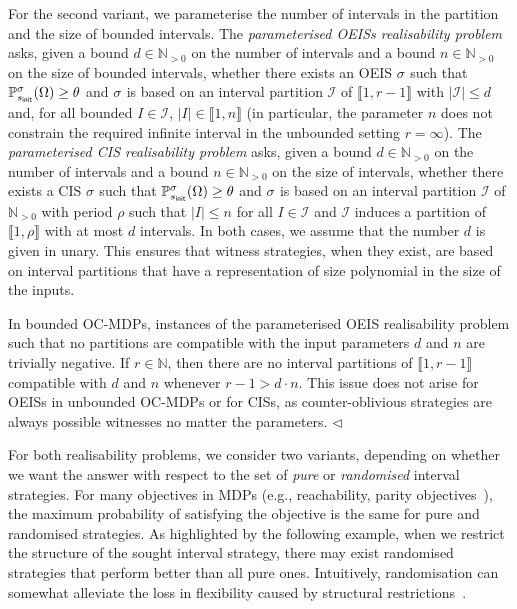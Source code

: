 \documentclass[a4paper,UKenglish,cleveref,autoref,thm-restate,colorlinks]{lipics-v2021}
\newcommand{\init}{\mathsf{init}}
\newcommand{\integerInterval}[1]{\llbracket{}#1\rrbracket{}}
\newcommand{\IN}{\mathbb{N}}
\newcommand{\INpos}{\IN_{>0}}
\newcommand{\ocConfig}{s}
\newcommand{\counterUB}{r}
\newcommand{\period}{\rho}
\newcommand{\intPart}{\mathcal{I}}
\newcommand{\interval}{I}
\newcommand{\intNum}{d}
\newcommand{\intSize}{n}
\newcommand{\objective}{\Omega}
\newcommand{\thresProba}{\theta}
\newcommand{\stratGeneric}[1]{{\sigma_{#1}}}
\newcommand{\strat}{\stratGeneric{}}
\begin{document}
For the second variant, we parameterise the number of intervals in the partition and the size of bounded intervals.
The  \textit{parameterised OEISs realisability problem} asks, given a bound $\intNum\in\INpos$ on the number of intervals and a bound $\intSize\in\INpos$ on the size of bounded intervals, whether there exists an OEIS $\strat$ such that $\probaG{\ocConfig_\init}{\strat}(\objective)\geq\thresProba$ and $\strat$ is based on an interval partition $\intPart$ of $\integerInterval{1, \counterUB-1}$ with $|\intPart|\leq\intNum$ and, for all bounded $\interval\in\intPart$, $|\interval|\in\integerInterval{1, \intSize}$ (in particular, the parameter $\intSize$ does not constrain the required infinite interval in the unbounded setting $\counterUB=\infty$).
The  \textit{parameterised CIS realisability problem} asks, given a bound  $\intNum\in\INpos$ on the number of intervals and a bound $\intSize\in\INpos$ on the size of intervals, whether there exists a CIS $\strat$ such that $\probaG{\ocConfig_\init}{\strat}(\objective)\geq\thresProba$ and $\strat$ is based on an interval partition $\intPart$ of $\INpos$ with period $\period$ such that $|\interval|\leq \intSize$ for all $\interval\in\intPart$ and $\intPart$ induces a partition of $\integerInterval{1, \period}$ with at most $\intNum$ intervals.
In both cases, we assume that the number $\intNum$ is given in unary.
This ensures that witness strategies, when they exist, are based on interval partitions that have a representation of size polynomial in the size of the inputs.

\begin{remark}\label{remark:oeis realisability:trivial parameters}
  In bounded OC-MDPs, instances of the parameterised OEIS realisability problem such that no partitions are compatible with the input parameters $\intNum$ and $\intSize$ are trivially negative.
  If $\counterUB\in\IN$, then there are no interval partitions of $\integerInterval{1, \counterUB-1}$ compatible with $\intNum$ and $\intSize$ whenever $\counterUB-1>\intNum\cdot\intSize$.
  This issue does not arise for OEISs in unbounded OC-MDPs or for CISs, as counter-oblivious strategies are always possible witnesses no matter the  parameters.
  \hfill$\lhd$
\end{remark}

For both realisability problems, we consider two variants, depending on whether we want the answer with respect to the set of \textit{pure} or \textit{randomised} interval strategies.
For many objectives in MDPs (e.g., reachability, parity objectives~\cite{BK08,DBLP:journals/lmcs/BouyerORV23}), the maximum probability of satisfying the objective is the same for pure and randomised strategies.
As highlighted by the following example, when we restrict the structure of the sought interval strategy, there may exist randomised strategies that perform better than all pure ones.
Intuitively, randomisation can somewhat alleviate the loss in flexibility caused by structural restrictions~\cite{DBLP:journals/acta/ChatterjeeRR14}.
\end{document}
